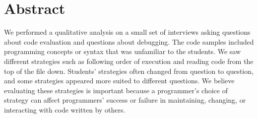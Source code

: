 \section{Abstract}
We performed a qualitative analysis on a small set of interviews asking questions about code evaluation and questions about debugging.
The code samples included programming concepts or syntax that was unfamiliar to the students.
We saw different strategies such as following order of execution and reading code from the top of the file down. Students' strategies often changed from question to question, and some strategies appeared more suited to different questions.
We believe evaluating these strategies is important because a programmer's choice of strategy can affect programmers' success or failure in maintaining, changing, or interacting with code written by others.

